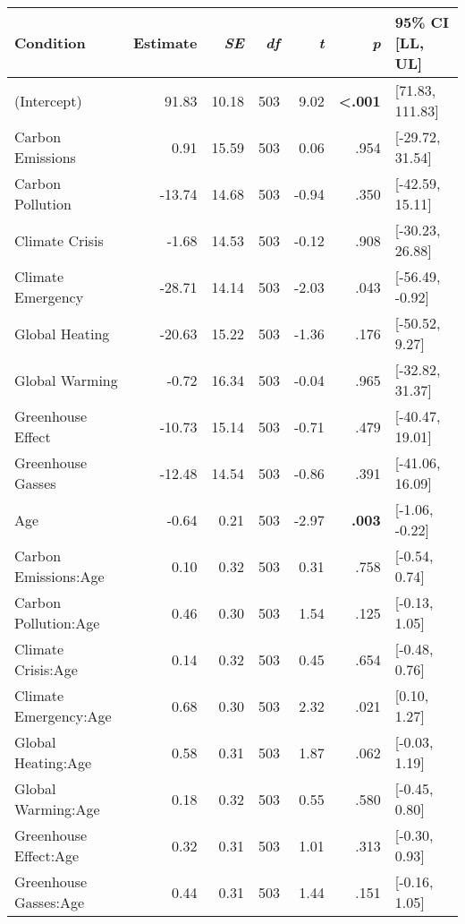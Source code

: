 \begin{table}[ht]
\centering
\begin{tabular}{lrrrrrl}
  \hline
Condition & Estimate & \textit{SE} & \textit{df} & \textit{t} & \textit{p} & 95\% CI [LL, UL] \\ 
  \hline
(Intercept) & 91.83 & 10.18 & 503 & 9.02 & \textbf{\textless  .001} & [71.83, 111.83] \\ 
  Carbon Emissions & 0.91 & 15.59 & 503 & 0.06 & .954 & [-29.72, 31.54] \\ 
  Carbon Pollution & -13.74 & 14.68 & 503 & -0.94 & .350 & [-42.59, 15.11] \\ 
  Climate Crisis & -1.68 & 14.53 & 503 & -0.12 & .908 & [-30.23, 26.88] \\ 
  Climate Emergency & -28.71 & 14.14 & 503 & -2.03 & .043 & [-56.49, -0.92] \\ 
  Global Heating & -20.63 & 15.22 & 503 & -1.36 & .176 & [-50.52, 9.27] \\ 
  Global Warming & -0.72 & 16.34 & 503 & -0.04 & .965 & [-32.82, 31.37] \\ 
  Greenhouse Effect & -10.73 & 15.14 & 503 & -0.71 & .479 & [-40.47, 19.01] \\ 
  Greenhouse Gasses & -12.48 & 14.54 & 503 & -0.86 & .391 & [-41.06, 16.09] \\ 
  Age & -0.64 & 0.21 & 503 & -2.97 & \textbf{.003} & [-1.06, -0.22] \\ 
  Carbon Emissions:Age & 0.10 & 0.32 & 503 & 0.31 & .758 & [-0.54, 0.74] \\ 
  Carbon Pollution:Age & 0.46 & 0.30 & 503 & 1.54 & .125 & [-0.13, 1.05] \\ 
  Climate Crisis:Age & 0.14 & 0.32 & 503 & 0.45 & .654 & [-0.48, 0.76] \\ 
  Climate Emergency:Age & 0.68 & 0.30 & 503 & 2.32 & .021 & [0.10, 1.27] \\ 
  Global Heating:Age & 0.58 & 0.31 & 503 & 1.87 & .062 & [-0.03, 1.19] \\ 
  Global Warming:Age & 0.18 & 0.32 & 503 & 0.55 & .580 & [-0.45, 0.80] \\ 
  Greenhouse Effect:Age & 0.32 & 0.31 & 503 & 1.01 & .313 & [-0.30, 0.93] \\ 
  Greenhouse Gasses:Age & 0.44 & 0.31 & 503 & 1.44 & .151 & [-0.16, 1.05] \\ 
   \hline
\end{tabular}
\end{table}
